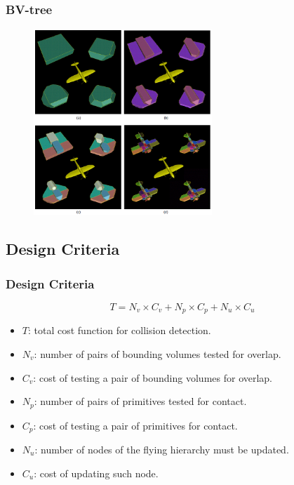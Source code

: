 \documentclass{beamer}
\begin{document}
	\begin{frame}
	\frametitle{BV-tree}
		\begin{figure}[h!]
			\centering
			\includegraphics[width=0.6\textwidth]{./figure/BVTrees.PNG}
		\end{figure}
	\end{frame}

\subsection{Design Criteria}
	\begin{frame}
	\frametitle{Design Criteria}
		$$T=N_{v} \times C_{v}+N_{p} \times C_{p}+N_{u} \times C_{u}$$
		\begin{itemize}
			\item $T$: total cost function for collision detection.
			\item $N_{v}$: number of pairs of bounding volumes tested for overlap.
			\item $C_{v}$: cost of testing a pair of bounding volumes for overlap.
			\item $N_{p}$: number of pairs of primitives tested for contact.
			\item $C_{p}$: cost of testing a pair of primitives for contact.
			\item $N_{u}$: number of nodes of the flying hierarchy must be updated.
			\item $C_{u}$: cost of updating such node.
		\end{itemize}
	\end{frame}

\end{document}
